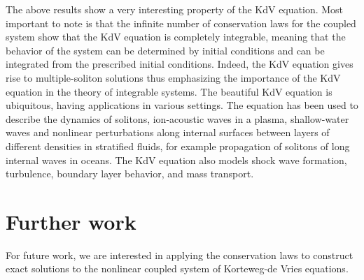 The above results show a very interesting property of the KdV equation. Most important to note is that the infinite number of conservation laws for the coupled system show that the KdV equation is completely integrable, meaning that the behavior of the system can be determined by initial conditions and can be integrated from the prescribed initial conditions. Indeed, the KdV equation gives rise to multiple-soliton solutions thus emphasizing the importance of the KdV equation in the theory of integrable systems. The beautiful KdV equation is ubiquitous, having applications in various settings.
The equation has been used to describe the dynamics of solitons, ion-acoustic waves in a plasma, shallow-water waves  and 
nonlinear perturbations along internal surfaces between layers of different densities in stratified fluids, for example propagation of solitons of long internal waves in oceans. The KdV equation also models shock wave formation, turbulence, boundary layer behavior, and mass transport.


\section*{Further work}
 For future work, we are interested in applying the conservation laws to construct exact solutions to the nonlinear coupled system of Korteweg-de Vries equations.